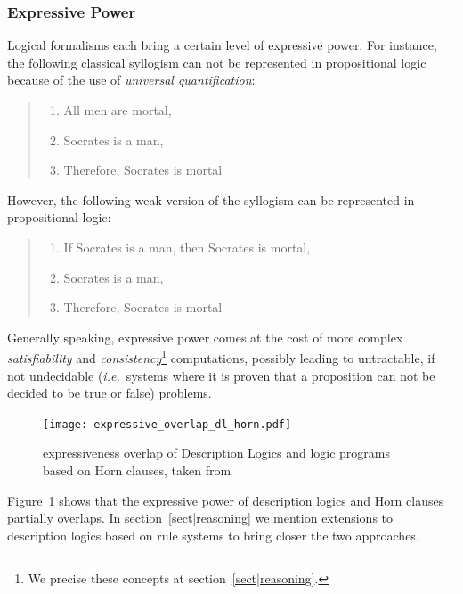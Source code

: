\documentclass[a4paper, twocolumn]{article}
\newcommand{\ie}{{\textit{i.e.\ }}}
\begin{document}
\subsubsection{Expressive Power}

Logical formalisms each bring a certain level of expressive power. For
instance, the following classical syllogism can not be represented in
propositional logic because of the use of \emph{universal quantification}:

\begin{quote}
\begin{enumerate}
    \item All men are mortal,
    \item Socrates is a man,
    \item Therefore, Socrates is mortal
\end{enumerate}
\end{quote}

However, the following weak version of the syllogism can be represented in
propositional logic:

\begin{quote}
\begin{enumerate}
    \item If Socrates is a man, then Socrates is mortal,
    \item Socrates is a man,
    \item Therefore, Socrates is mortal
\end{enumerate}
\end{quote}

Generally speaking, expressive power comes at the cost of more complex
\emph{satisfiability} and \emph{consistency}\footnote{We precise these concepts
at section~\ref{sect|reasoning}.} computations, possibly leading to
untractable, if not undecidable (\ie systems where it is proven that a
proposition can not be decided to be true or false) problems.

\begin{figure}
    \centering
    \texttt{[image: expressive\_overlap\_dl\_horn.pdf]}
    \caption{expressiveness overlap of Description Logics and logic programs
    based on Horn clauses, taken from~\cite{Grosof2003}}
    \label{fig|overlap_dl_horn}
\end{figure}

Figure~\ref{fig|overlap_dl_horn} shows that the expressive power of description
logics and Horn clauses partially overlaps. In section~\ref{sect|reasoning} we
mention extensions to description logics based on rule systems to bring closer
the two approaches.
\end{document}
